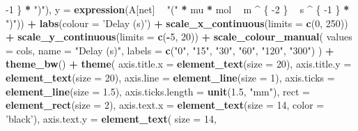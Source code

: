 \documentclass[
]{krantz}
\makeatletter
\newenvironment{Shaded}{\begin{snugshade}}{\end{snugshade}}
\newcommand{\DataTypeTok}[1]{\textcolor[rgb]{0.13,0.29,0.53}{#1}}
\newcommand{\DecValTok}[1]{\textcolor[rgb]{0.00,0.00,0.81}{#1}}
\newcommand{\FloatTok}[1]{\textcolor[rgb]{0.00,0.00,0.81}{#1}}
\newcommand{\KeywordTok}[1]{\textcolor[rgb]{0.13,0.29,0.53}{\textbf{#1}}}
\newcommand{\NormalTok}[1]{#1}
\newcommand{\OperatorTok}[1]{\textcolor[rgb]{0.81,0.36,0.00}{\textbf{#1}}}
\newcommand{\StringTok}[1]{\textcolor[rgb]{0.31,0.60,0.02}{#1}}
\newenvironment{kframe}{%
\medskip{}
\setlength{\fboxsep}{.8em}
 \def\at@end@of@kframe{}%
 \ifinner\ifhmode%
  \def\at@end@of@kframe{\end{minipage}}%
  \begin{minipage}{\columnwidth}%
 \fi\fi%
 \def\FrameCommand##1{\hskip\@totalleftmargin \hskip-\fboxsep
 \colorbox{shadecolor}{##1}\hskip-\fboxsep
     \hskip-\linewidth \hskip-\@totalleftmargin \hskip\columnwidth}%
 \MakeFramed {\advance\hsize-\width
   \@totalleftmargin\z@ \linewidth\hsize
   \@setminipage}}%
 {\par\unskip\endMakeFramed%
 \at@end@of@kframe}
\renewenvironment{Shaded}{\begin{kframe}}{\end{kframe}}
\makeatother
\begin{document}
\begin{Shaded}
\begin{Highlighting}[]
    \DecValTok{-1}
\NormalTok{  \} }\OperatorTok{*}\StringTok{ ")"}\NormalTok{),}
  \DataTypeTok{y =} \KeywordTok{expression}\NormalTok{(A[net] }\OperatorTok{~}\StringTok{ "("} \OperatorTok{*}\StringTok{ }\NormalTok{mu }\OperatorTok{*}\StringTok{ }\NormalTok{mol }\OperatorTok{~}\StringTok{ }\NormalTok{m }\OperatorTok{^}\StringTok{ }\NormalTok{\{}
    \DecValTok{-2}
\NormalTok{  \} }\OperatorTok{~}\StringTok{ }\NormalTok{s }\OperatorTok{^}\StringTok{ }\NormalTok{\{}
    \DecValTok{-1}
\NormalTok{  \} }\OperatorTok{*}\StringTok{ ")"}\NormalTok{)) }\OperatorTok{+}
\StringTok{  }\KeywordTok{labs}\NormalTok{(}\DataTypeTok{colour =} \StringTok{'Delay (s)'}\NormalTok{) }\OperatorTok{+}
\StringTok{  }\KeywordTok{scale_x_continuous}\NormalTok{(}\DataTypeTok{limits =} \KeywordTok{c}\NormalTok{(}\DecValTok{0}\NormalTok{, }\DecValTok{250}\NormalTok{)) }\OperatorTok{+}
\StringTok{  }\KeywordTok{scale_y_continuous}\NormalTok{(}\DataTypeTok{limits =} \KeywordTok{c}\NormalTok{(}\OperatorTok{-}\DecValTok{5}\NormalTok{, }\DecValTok{20}\NormalTok{)) }\OperatorTok{+}
\StringTok{  }\KeywordTok{scale_colour_manual}\NormalTok{(}
    \DataTypeTok{values =}\NormalTok{ cols,}
    \DataTypeTok{name =} \StringTok{"Delay (s)"}\NormalTok{,}
    \DataTypeTok{labels =} \KeywordTok{c}\NormalTok{(}\StringTok{"0"}\NormalTok{, }\StringTok{"15"}\NormalTok{, }\StringTok{"30"}\NormalTok{, }\StringTok{"60"}\NormalTok{, }\StringTok{"120"}\NormalTok{, }\StringTok{"300"}\NormalTok{)}
\NormalTok{  ) }\OperatorTok{+}
\StringTok{  }\KeywordTok{theme_bw}\NormalTok{() }\OperatorTok{+}
\StringTok{  }\KeywordTok{theme}\NormalTok{(}
    \DataTypeTok{axis.title.x =} \KeywordTok{element_text}\NormalTok{(}\DataTypeTok{size =} \DecValTok{20}\NormalTok{),}
    \DataTypeTok{axis.title.y =} \KeywordTok{element_text}\NormalTok{(}\DataTypeTok{size =} \DecValTok{20}\NormalTok{),}
    \DataTypeTok{axis.line =} \KeywordTok{element_line}\NormalTok{(}\DataTypeTok{size =} \DecValTok{1}\NormalTok{),}
    \DataTypeTok{axis.ticks =} \KeywordTok{element_line}\NormalTok{(}\DataTypeTok{size =} \FloatTok{1.5}\NormalTok{),}
    \DataTypeTok{axis.ticks.length =} \KeywordTok{unit}\NormalTok{(}\FloatTok{1.5}\NormalTok{, }\StringTok{"mm"}\NormalTok{),}
    \DataTypeTok{rect =} \KeywordTok{element_rect}\NormalTok{(}\DataTypeTok{size =} \DecValTok{2}\NormalTok{),}
    \DataTypeTok{axis.text.x =} \KeywordTok{element_text}\NormalTok{(}\DataTypeTok{size =} \DecValTok{14}\NormalTok{, }\DataTypeTok{color =} \StringTok{'black'}\NormalTok{),}
    \DataTypeTok{axis.text.y =}
      \KeywordTok{element_text}\NormalTok{(}
        \DataTypeTok{size =} \DecValTok{14}\NormalTok{,}

\end{Highlighting}
\end{Shaded}
\end{document}
